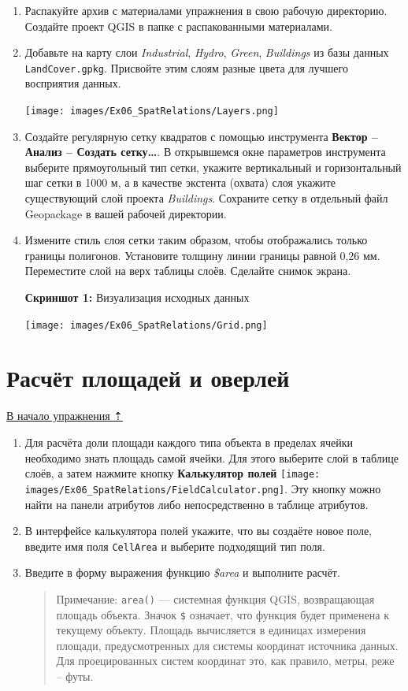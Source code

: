 \documentclass[
  12pt,
]{book}
\begin{document}
\begin{enumerate}
\def\labelenumi{\arabic{enumi}.}
\item
  Распакуйте архив с материалами упражнения в свою рабочую директорию. Создайте проект QGIS в папке с распакованными материалами.
\item
  Добавьте на карту слои \emph{Industrial}, \emph{Hydro}, \emph{Green}, \emph{Buildings} из базы данных \texttt{LandCover.gpkg}. Присвойте этим слоям разные цвета для лучшего восприятия данных.

  \texttt{[image: images/Ex06\_SpatRelations/Layers.png]}
\item
  Создайте регулярную сетку квадратов с помощью инструмента \textbf{Вектор -- Анализ -- Создать сетку\ldots{}}. В открывшемся окне параметров инструмента выберите прямоугольный тип сетки, укажите вертикальный и горизонтальный шаг сетки в 1000 м, а в качестве экстента (охвата) слоя укажите существующий слой проекта \emph{Buildings}. Сохраните сетку в отдельный файл Geopackage в вашей рабочей директории.
\item
  Измените стиль слоя сетки таким образом, чтобы отображались только границы полигонов. Установите толщину линии границы равной 0,26 мм. Переместите слой на верх таблицы слоёв. Сделайте снимок экрана.

  \textbf{Скриншот 1:} Визуализация исходных данных

  \texttt{[image: images/Ex06\_SpatRelations/Grid.png]}
\end{enumerate}

\hypertarget{spatrelations-overlay}{%
\section{Расчёт площадей и оверлей}\label{spatrelations-overlay}}

\protect\hyperlink{spatrelations}{В начало упражнения ⇡}

\begin{enumerate}
\def\labelenumi{\arabic{enumi}.}
\item
  Для расчёта доли площади каждого типа объекта в пределах ячейки необходимо знать площадь самой ячейки. Для этого выберите слой в таблице слоёв, а затем нажмите кнопку \textbf{Калькулятор полей} \texttt{[image: images/Ex06\_SpatRelations/FieldCalculator.png]}. Эту кнопку можно найти на панели атрибутов либо непосредственно в таблице атрибутов.
\item
  В интерфейсе калькулятора полей укажите, что вы создаёте новое поле, введите имя поля \texttt{CellArea} и выберите подходящий тип поля.
\item
  Введите в форму выражения функцию \emph{\$area} и выполните расчёт.

  \begin{quote}
  Примечание: \texttt{area()} --- системная функция QGIS, возвращающая площадь объекта. Значок \texttt{\$} означает, что функция будет применена к текущему объекту. Площадь вычисляется в единицах измерения площади, предусмотренных для системы координат источника данных. Для проецированных систем координат это, как правило, метры, реже -- футы.
  \end{quote}
\end{enumerate}
\end{document}
